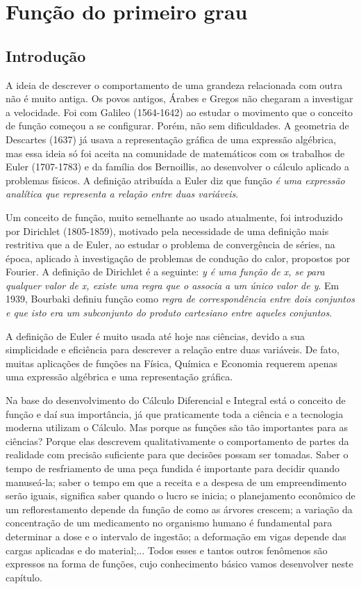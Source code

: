 \chapter{Função do primeiro grau}

\section{Introdução}

A ideia de descrever o comportamento de uma grandeza relacionada com outra não é muito antiga. Os povos antigos, Árabes e Gregos não chegaram a investigar a velocidade. Foi com Galileo (1564-1642) ao estudar o movimento que o conceito de função começou a se configurar. Porém, não sem dificuldades. A geometria de Descartes (1637) já usava a representação gráfica de uma expressão algébrica, mas essa ideia só foi aceita na comunidade de matemáticos com os trabalhos de Euler (1707-1783) e da família dos Bernoillis, ao desenvolver o cálculo aplicado a problemas físicos. A definição atribuída a Euler diz que função \textit{é uma expressão analítica que representa a relação entre duas variáveis}. 

Um conceito de função, muito semelhante ao usado atualmente, foi introduzido por Dirichlet (1805-1859), motivado pela necessidade de uma definição mais restritiva que a de Euler, ao estudar o problema de convergência de séries, na época, aplicado à investigação de problemas de condução do calor, propostos por Fourier. A definição de Dirichlet é a seguinte: \textit{y é uma função de x, se para qualquer valor de x, existe uma regra que o associa a um único valor de y}. Em 1939, Bourbaki definiu função como \textit{regra de correspondência entre dois conjuntos e que isto era um subconjunto do produto cartesiano entre aqueles conjuntos}.

A definição de Euler é muito usada até hoje nas ciências, devido a sua simplicidade e eficiência para descrever a relação entre duas variáveis. De fato, muitas aplicações de funções na Física, Química e Economia requerem apenas uma expressão algébrica e uma representação gráfica.

Na base do desenvolvimento do Cálculo Diferencial e Integral está o conceito de função e daí sua importância, já que praticamente toda a ciência e a tecnologia moderna utilizam o Cálculo. Mas porque as funções são tão importantes para as ciências? Porque elas descrevem qualitativamente o comportamento de partes da realidade com precisão suficiente para que decisões possam ser tomadas. Saber o tempo de resfriamento de uma peça fundida é importante para decidir quando manuseá-la; saber o tempo em que a receita e a despesa de um empreendimento serão iguais, significa saber quando o lucro se inicia; o planejamento econômico de um reflorestamento depende da função de como as árvores crescem; a variação da concentração de um medicamento no organismo humano é fundamental para determinar a dose e o intervalo de ingestão; a deformação em vigas depende das cargas aplicadas e do material;... Todos esses e tantos outros fenômenos são expressos na forma de funções, cujo conhecimento básico vamos desenvolver neste capítulo.

